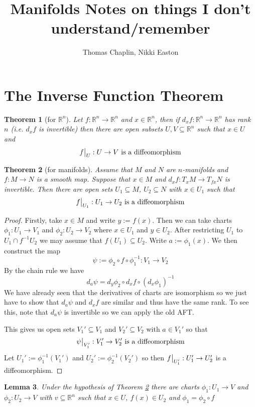 \documentclass[11pt]{article}
\title{Manifolds Notes on things I don't understand/remember}
\author{Thomas Chaplin, Nikki Easton}
\date{}
\newcommand{\defeq}{:=}
\newcommand\restr[2]{{%
  \left.\kern-\nulldelimiterspace %
  #1 %
  \vphantom{\big|} %
  \right|_{#2} %
  }}
\newcommand{\R}{\mathbb{R}}
\newtheorem{theorem}{Theorem}[section]
\newtheorem{lemma}[theorem]{Lemma}
\begin{document}
\maketitle
\tableofcontents
\newpage

\section{The Inverse Function Theorem}

\begin{theorem}[for $\R^n$]
Let $f:\R^n \to \R^n$ and $x\in \R^n$, then if $d_xf:\R^n \to \R^n$ has rank $n$ (i.e. $d_xf$ is invertible) then there are open subsets $U, V \subseteq \R^n$ such that $x\in U$ and
\[
	\restr{f}{U}: U \to V \text{ is a diffeomorphism}
\]
\end{theorem}

\begin{theorem}[for manifolds]
Assume that $M$ and $N$ are $n$-manifolds and $f:M \to N$ is a smooth map.
Suppose that $x\in M$ and $d_xf:T_xM \to T_{fx}N$ is invertible.
Then there are open sets $U_1\subseteq M$, $U_2\subseteq N$ with $x\in U_1$ such that
\[
	\restr{f}{U_1}:U_1 \to U_2 \text{ is a diffeomorphism}
\]
\label{th:iftmani}
\end{theorem}

\begin{proof}
Firstly, take $x\in M$ and write $y\defeq f(x)$.
Then we can take charts $\phi_1: U_1 \to V_1$ and $\phi_2: U_2 \to V_2$ where $x\in U_1$ and $y\in U_2$.
After restricting $U_1$ to $U_1\cap f^{-1}U_2$ we may assume that $f(U_1) \subseteq U_2$.
Write $a\defeq \phi_1(x)$.
We then construct the map
\[
	\psi \defeq \phi_2 \circ f \circ \phi_1^{-1}: V_1 \to V_2
\]
By the chain rule we have
\[
	d_a\psi = d_y\phi_2 \circ d_x f \circ (d_x\phi_1)^{-1}
\]
We have already seen that the derivatives of charts are isomorphism so we just have to show that $d_a\psi$ and $d_x f$ are similar and thus have the same rank.
To see this, note that $d_a\psi$ is invertible so we can apply the old AFT.

This gives us open sets $V_1' \subseteq V_1$ and $V_2' \subseteq V_2$ with $a\in V_1'$ so that
\[
	\restr{\psi}{V_1'}:V_1' \to V_2' \text{ is a diffeomorphism}
\]
Let $U_1'\defeq \phi_1^{-1}(V_1')$ and $U_2'\defeq \phi_2^{-1}(V_2')$ so then $\restr{f}{U_1'}:U_1'\to U_2'$ is a diffeomorphism.
\end{proof}

\begin{lemma}
\label{le:f2id}
Under the hypothesis of Theorem \ref{th:iftmani} there are charts $\phi_1: U_1 \to V$ and $\phi_2: U_2 \to V$ with $v\subseteq \R^n$ such that $x\in U$, $f(x)\in U_2$ and $\phi_1 = \phi_2 \circ f$
\end{lemma}
\end{document}
